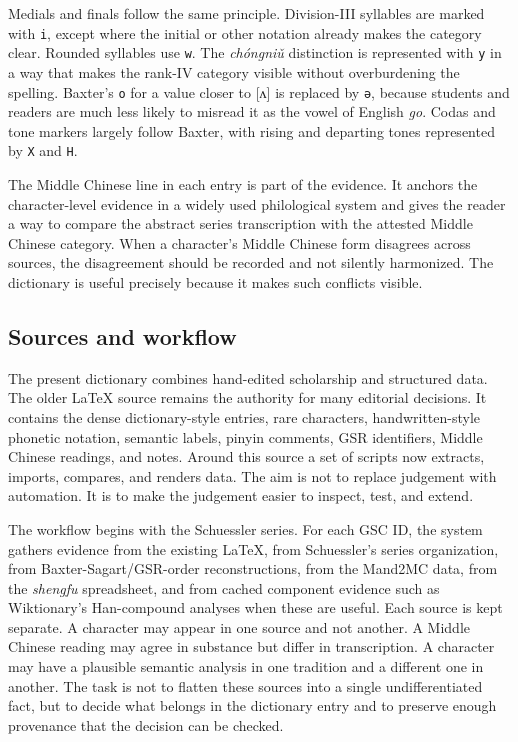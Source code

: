 Medials and finals follow the same principle. Division-III syllables are marked with \texttt{i}, except where the initial or other notation already makes the category clear. Rounded syllables use \texttt{w}. The \emph{chóngniǔ} distinction is represented with \texttt{y} in a way that makes the rank-IV category visible without overburdening the spelling. Baxter's \texttt{o} for a value closer to {[}ʌ{]} is replaced by \texttt{ə}, because students and readers are much less likely to misread it as the vowel of English \emph{go}. Codas and tone markers largely follow Baxter, with rising and departing tones represented by \texttt{X} and \texttt{H}.

The Middle Chinese line in each entry is part of the evidence. It anchors the character-level evidence in a widely used philological system and gives the reader a way to compare the abstract series transcription with the attested Middle Chinese category. When a character's Middle Chinese form disagrees across sources, the disagreement should be recorded and not silently harmonized. The dictionary is useful precisely because it makes such conflicts visible.

\subsection*{Sources and workflow}

The present dictionary combines hand-edited scholarship and structured data. The older LaTeX source remains the authority for many editorial decisions. It contains the dense dictionary-style entries, rare characters, handwritten-style phonetic notation, semantic labels, pinyin comments, GSR identifiers, Middle Chinese readings, and notes. Around this source a set of scripts now extracts, imports, compares, and renders data. The aim is not to replace judgement with automation. It is to make the judgement easier to inspect, test, and extend.

The workflow begins with the Schuessler series. For each GSC ID, the system gathers evidence from the existing LaTeX, from Schuessler's series organization, from Baxter-Sagart/GSR-order reconstructions, from the Mand2MC data, from the \emph{shengfu} spreadsheet, and from cached component evidence such as Wiktionary's Han-compound analyses when these are useful. Each source is kept separate. A character may appear in one source and not another. A Middle Chinese reading may agree in substance but differ in transcription. A character may have a plausible semantic analysis in one tradition and a different one in another. The task is not to flatten these sources into a single undifferentiated fact, but to decide what belongs in the dictionary entry and to preserve enough provenance that the decision can be checked.


